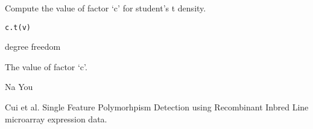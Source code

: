\begin{Description}\relax
Compute the value of factor `c' for student's t density.
\end{Description}
\begin{Usage}
\begin{verbatim}
c.t(v)
\end{verbatim}
\end{Usage}
\begin{Arguments}
\begin{ldescription}
\item[\code{v}] degree freedom

\end{ldescription}
\end{Arguments}
\begin{Value}
The value of factor `c'.
\end{Value}
\begin{Author}\relax
Na You
\end{Author}
\begin{References}\relax
Cui et al.
Single Feature Polymorhpism Detection using Recombinant Inbred Line
microarray expression data.
\end{References}

